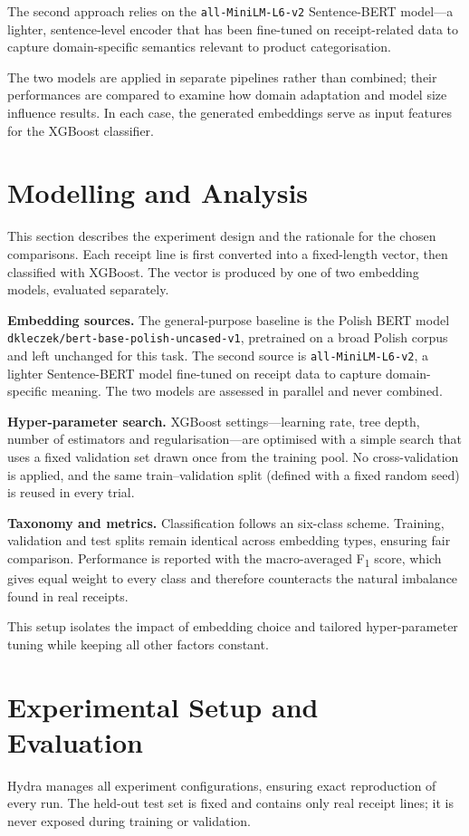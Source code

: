 \documentclass{SGGW-thesis-EN}
\begin{document}
The second approach relies on the \texttt{all-MiniLM-L6-v2} Sentence-BERT model—a lighter, sentence-level encoder that
has been fine-tuned on receipt-related data to capture domain-specific semantics relevant to product categorisation.

The two models are applied in separate pipelines rather than combined; their performances are compared to examine how
domain adaptation and model size influence results.  In each case, the generated embeddings serve as input features for
the XGBoost classifier.



\section{Modelling and Analysis}
This section describes the experiment design and the rationale for the chosen comparisons. Each receipt line is first
converted into a fixed-length vector, then classified with XGBoost. The vector is produced by one of two embedding
models, evaluated separately.

\textbf{Embedding sources.} The general-purpose baseline is the Polish BERT model
\texttt{dkleczek/bert-base-polish-uncased-v1}, pretrained on a broad Polish corpus and left unchanged for this task. The
second source is \texttt{all-MiniLM-L6-v2}, a lighter Sentence-BERT model fine-tuned on receipt data to capture
domain-specific meaning. The two models are assessed in parallel and never combined.

\textbf{Hyper-parameter search.} XGBoost settings—learning rate, tree depth, number of estimators and regularisation—are
optimised with a simple search that uses a fixed validation set drawn once from the training pool. No cross-validation
is applied, and the same train–validation split (defined with a fixed random seed) is reused in every trial.

\textbf{Taxonomy and metrics.} Classification follows an six-class scheme. Training, validation and test splits remain
identical across embedding types, ensuring fair comparison. Performance is reported with the macro-averaged
F\textsubscript{1} score, which gives equal weight to every class and therefore counteracts the natural imbalance found
in real receipts.

This setup isolates the impact of embedding choice and tailored hyper-parameter tuning while keeping all other factors
constant.

\section{Experimental Setup and Evaluation}
Hydra manages all experiment configurations, ensuring exact reproduction of every run. The held-out test set is fixed
and contains only real receipt lines; it is never exposed during training or validation.
\end{document}
